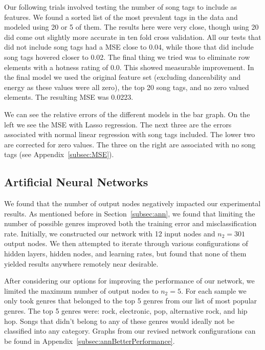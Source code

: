 \documentclass[12pt]{article}
\begin{document}
Our following trials involved testing the number of song tags to include as features. We found a sorted list of the most prevalent tags in the data and modeled using 20 or 5 of them. The results here were very close, though using 20 did come out slightly more accurate in ten fold cross validation. All our tests that did not include song tags had a MSE close to 0.04, while those that did include song tags hovered closer to 0.02. The final thing we tried was to eliminate row elements with a hotness rating of 0.0. This showed measurable improvement. In the final model we used the original feature set (excluding danceability and energy as these values were all zero), the top 20 song tags, and no zero valued elements. The resulting MSE was 0.0223.

We can see the relative errors of the different models in the bar graph. On the left we see the MSE with Lasso regression. The next three are the errors associated with normal linear regression with song tags included. The lower two are corrected for zero values. The three on the right are associated with no song tags (see Appendix~\ref{subsec:MSE}).

\subsection{Artificial Neural Networks}
\label{subsec:annResults}
We found that the number of output nodes negatively impacted our experimental results. As mentioned before in Section~\ref{subsec:ann}, we found that limiting the number of possible genres improved both the training error and misclassification rate. Initially, we constructed our network with 12 input nodes and $n_2 = 301$ output nodes. We then attempted to iterate through various configurations of hidden layers, hidden nodes, and learning rates, but found that none of them yielded results anywhere remotely near desirable.

After considering our options for improving the performance of our network, we limited the maximum number of output nodes to $n_2 = 5$. For each sample we only took genres that belonged to the top 5 genres from our list of most popular genres. The top 5 genres were: rock, electronic, pop, alternative rock, and hip hop. Songs that didn't belong to any of these genres would ideally not be classified into any category. Graphs from our revised network configurations can be found in Appendix~\ref{subsec:annBetterPerformance}.
\end{document}
